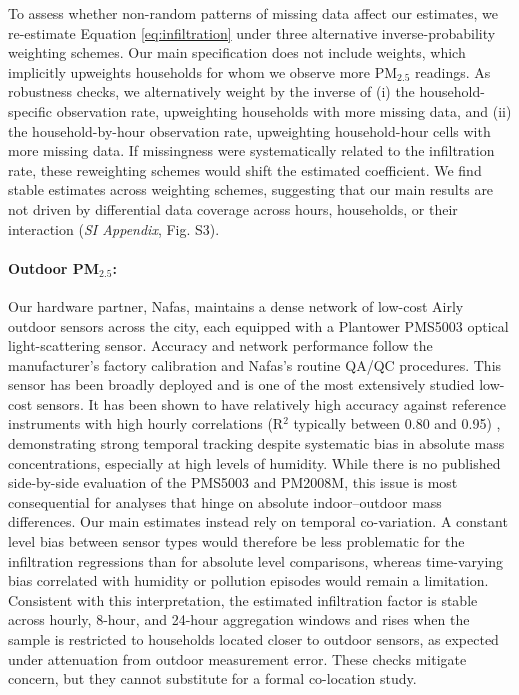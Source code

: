 \documentclass[9pt,twocolumn,twoside]{pnas-new}
\begin{document}
To assess whether non-random patterns of missing data affect our estimates, we re-estimate Equation \ref{eq:infiltration} under three alternative inverse-probability weighting schemes. Our main specification does not include weights, which implicitly upweights households for whom we observe more PM$_{2.5}$ readings. As robustness checks, we alternatively weight by the inverse of (i) the household-specific observation rate, upweighting households with more missing data, and (ii) the household-by-hour observation rate, upweighting household-hour cells with more missing data. If missingness were systematically related to the infiltration rate, these reweighting schemes would shift the estimated coefficient. We find stable estimates across weighting schemes, suggesting that our main results are not driven by differential data coverage across hours, households, or their interaction (\textit{SI Appendix}, Fig. S3).

\paragraph{Outdoor PM$_{2.5}$:} Our hardware partner, Nafas, maintains a dense network of low-cost Airly outdoor sensors across the city, each equipped with a Plantower PMS5003 optical light-scattering sensor. Accuracy and network performance follow the manufacturer’s factory calibration and Nafas’s routine QA/QC procedures. This sensor has been broadly deployed and is one of the most extensively studied low-cost sensors. It has been shown to have relatively high accuracy against reference instruments with high hourly correlations (R$^2$ typically between 0.80 and 0.95) \citep{Sayahi2019, Zheng2018}, demonstrating strong temporal tracking despite systematic bias in absolute mass concentrations, especially at high levels of humidity.
While there is no published side-by-side evaluation of the PMS5003 and PM2008M, this issue is most consequential for analyses that hinge on absolute indoor–outdoor mass differences. Our main estimates instead rely on temporal co-variation. A constant level bias between sensor types would therefore be less problematic for the infiltration regressions than for absolute level comparisons, whereas time-varying bias correlated with humidity or pollution episodes would remain a limitation. Consistent with this interpretation, the estimated infiltration factor is stable across hourly, 8-hour, and 24-hour aggregation windows and rises when the sample is restricted to households located closer to outdoor sensors, as expected under attenuation from outdoor measurement error. These checks mitigate concern, but they cannot substitute for a formal co-location study.
\end{document}
